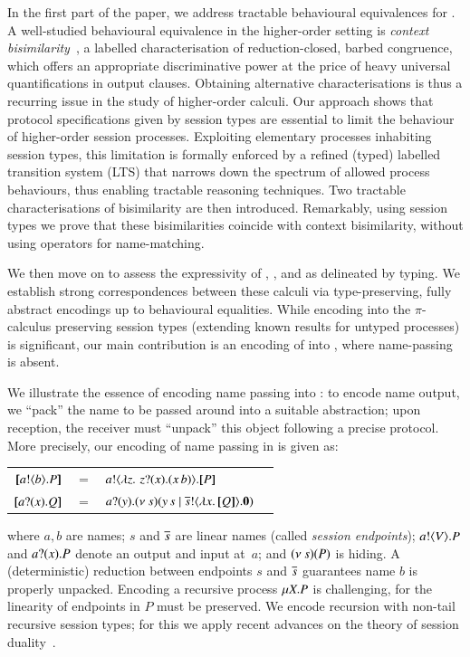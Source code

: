 In the first part of the paper, we address tractable behavioural equivalences
for \HOp.
A well-studied behavioural equivalence in the higher-order setting 
is \emph{context bisimilarity}~\cite{San96H},
a labelled characterisation of reduction-closed, barbed congruence, 
which offers an appropriate discriminative power at the price of heavy universal quantifications in output clauses.
Obtaining alternative characterisations 
is thus a recurring issue 
in the study of higher-order calculi. 
Our approach 
shows that protocol specifications given by session types are 
essential to  limit 
the behaviour of higher-order session processes. 
Exploiting elementary processes inhabiting session types, 
this limitation is formally enforced by 
a refined (typed) labelled transition system (LTS)
that narrows down the spectrum of allowed process behaviours, 
thus enabling tractable reasoning techniques. 
Two tractable characterisations of bisimilarity 
are then introduced. 
Remarkably, using session types we prove that these %
bisimilarities coincide with context bisimilarity, without using
operators for 
name-matching.

We then move on to assess the expressivity 
 of \HOp, \HO, and \sessp as delineated by typing. 
We establish strong correspondences between 
these calculi  via type-preserving, fully abstract encodings up to 
behavioural equalities. While encoding \HOp 
into the $\pi$-calculus preserving session types 
(extending  known  results for untyped processes) is 
significant, 
our main contribution is 
an encoding of \HOp into \HO, where name-passing is absent.  

We illustrate the essence of encoding name passing into \HO: 
to encode name output, we ``pack''
the name to be passed around into a suitable abstraction; 
upon reception, the receiver must ``unpack'' this object following a precise protocol.
More precisely, our encoding 
{of name passing}
in \HO is given as:
\begin{center}
\begin{tabular}{rcll}
  $[\!\![a ! \langle b \rangle . P]\!\!]$	&$=$&	$a ! \langle  \lambda z.\,\,z ? (x) . (x\,b)  \rangle . [\!\![P]\!\!]$ \\
  $[\!\![a ? (x) . Q]\!\!]$	&$=$&	$a ? (y) . (\nu\ s)(y\,s \;|\; \overline{s} ! \langle \lambda x.\,[\!\![Q]\!\!] \rangle . \mathbf{0})$
\end{tabular}
\end{center}
\noi where $a,b$ are names; $s$ and $\overline{s}$ are 
linear names (called \emph{session endpoints});
$a ! \langle V \rangle . P$ and 
$a ? (x) . P$ denote an output and input at~$a$;   
and $(\nu\ s)(P)$ is hiding. 
A (deterministic) reduction between   endpoints 
$s$ and $\overline{s}$ guarantees name $b$ is properly unpacked.
Encoding a recursive process $\mu X. P$ is  challenging, for 
the linearity of endpoints in $P$ must be preserved.
We encode recursion with non-tail recursive session types; for this 
we apply recent advances on the theory of session duality~\cite{TGC14,DBLP:journals/corr/abs-1202-2086}.

